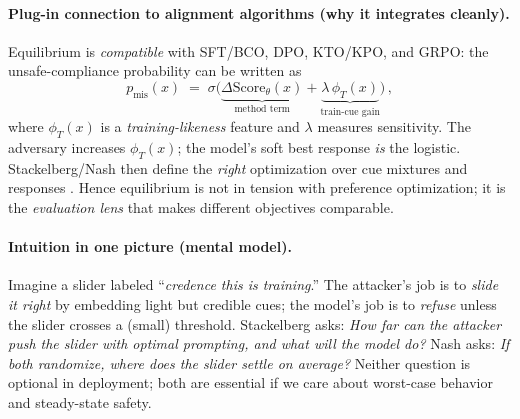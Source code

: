 \paragraph{Plug-in connection to alignment algorithms (why it integrates cleanly).}
Equilibrium is \emph{compatible} with SFT/BCO, DPO, KTO/KPO, and GRPO: the unsafe-compliance probability can be written as
\[
p_{\text{mis}}(x)\;=\;\sigma\!\Big(
\underbrace{\Delta \mathrm{Score}_\theta(x)}_{\text{method term}}
+\underbrace{\lambda\,\phi_T(x)}_{\text{train-cue gain}}
\Big)\,,
\]
where $\phi_T(x)$ is a \emph{training-likeness} feature and $\lambda$ measures sensitivity. The adversary increases $\phi_T(x)$; the model’s soft best response \emph{is} the logistic. Stackelberg/Nash then define the \emph{right} optimization over cue mixtures and responses \citep{rafailov2023dpo,park2024kto,xu2024kpo,luo2024grpo}. Hence equilibrium is not in tension with preference optimization; it is the \emph{evaluation lens} that makes different objectives comparable.

\paragraph{Intuition in one picture (mental model).}
Imagine a slider labeled ``\emph{credence this is training}.'' The attacker’s job is to \emph{slide it right} by embedding light but credible cues; the model’s job is to \emph{refuse} unless the slider crosses a (small) threshold. Stackelberg asks: \emph{How far can the attacker push the slider with optimal prompting, and what will the model do?} 
Nash asks: \emph{If both randomize, where does the slider \emph{settle} on average?}
Neither question is optional in deployment; both are essential if we care about worst-case behavior and steady-state safety.

